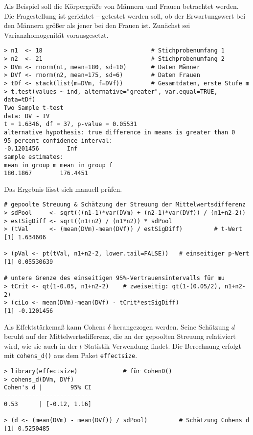 Als Beispiel soll die Körpergröße von Männern und Frauen betrachtet werden. Die Fragestellung ist gerichtet -- getestet werden soll, ob der Erwartungswert bei den Männern größer als jener bei den Frauen ist. Zunächst sei Varianzhomogenität vorausgesetzt.
\begin{lstlisting}
> n1  <- 18                               # Stichprobenumfang 1
> n2  <- 21                               # Stichprobenumfang 2
> DVm <- rnorm(n1, mean=180, sd=10)       # Daten Männer
> DVf <- rnorm(n2, mean=175, sd=6)        # Daten Frauen
> tDf <- stack(list(m=DVm, f=DVf))        # Gesamtdaten, erste Stufe m
> t.test(values ~ ind, alternative="greater", var.equal=TRUE, data=tDf)
Two Sample t-test
data: DV ~ IV
t = 1.6346, df = 37, p-value = 0.05531
alternative hypothesis: true difference in means is greater than 0
95 percent confidence interval:
-0.1201456        Inf
sample estimates:
mean in group m mean in group f
180.1867        176.4451
\end{lstlisting}

Das Ergebnis lässt sich manuell prüfen.
\begin{lstlisting}
# gepoolte Streuung & Schätzung der Streuung der Mittelwertsdifferenz
> sdPool     <- sqrt(((n1-1)*var(DVm) + (n2-1)*var(DVf)) / (n1+n2-2))
> estSigDiff <- sqrt((n1+n2) / (n1*n2)) * sdPool
> (tVal      <- (mean(DVm)-mean(DVf)) / estSigDiff)         # t-Wert
[1] 1.634606

> (pVal <- pt(tVal, n1+n2-2, lower.tail=FALSE))   # einseitiger p-Wert
[1] 0.05530639

# untere Grenze des einseitigen 95%-Vertrauensintervalls für mu
> tCrit <- qt(1-0.05, n1+n2-2)    # zweiseitig: qt(1-(0.05/2), n1+n2-2)
> (ciLo <- mean(DVm)-mean(DVf) - tCrit*estSigDiff)
[1] -0.1201456
\end{lstlisting}

Als Effektstärkemaß kann Cohens $\delta$ herangezogen werden. Seine Schätzung $d$ beruht auf der Mittelwertsdifferenz, die an der gepoolten Streuung relativiert wird, wie sie auch in der $t$-Statistik Verwendung findet. Die Berechnung erfolgt mit \lstinline!cohens_d()! aus dem Paket \lstinline!effectsize!.
\begin{lstlisting}
> library(effectsize)             # für CohenD()
> cohens_d(DVm, DVf)
Cohen's d |        95% CI
-------------------------
0.53      | [-0.12, 1.16]

> (d <- (mean(DVm) - mean(DVf)) / sdPool)         # Schätzung Cohens d
[1] 0.5250485
\end{lstlisting}

